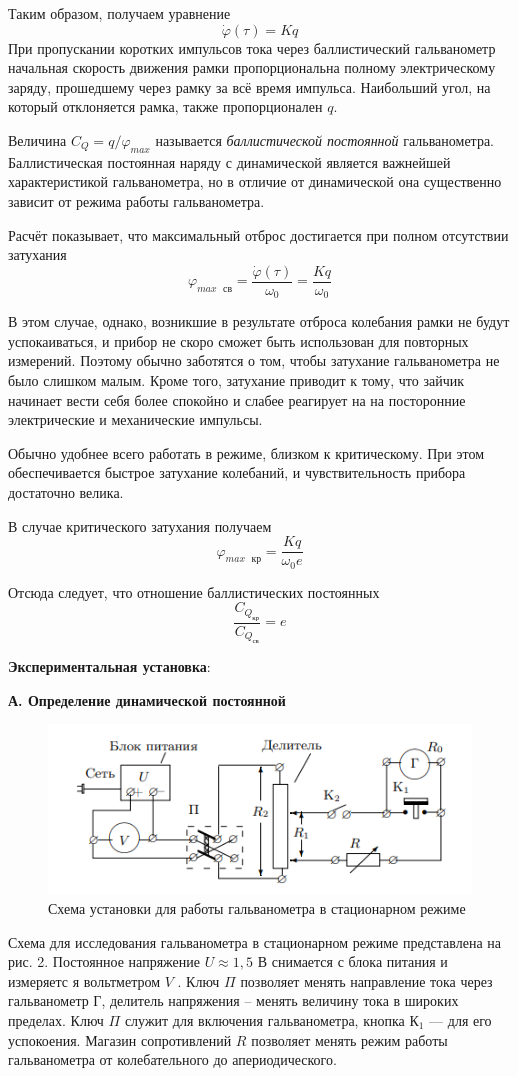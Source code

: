 \documentclass[a4paper,12pt]{article}
\begin{document}
Таким образом, получаем уравнение
\begin{equation}\label{eq: izmerenieZaryada}
    \dot\varphi (\tau) = Kq
\end{equation}
При пропускании коротких импульсов тока через баллистический гальванометр начальная скорость движения рамки пропорциональна полному электрическому заряду, прошедшему через рамку за всё время импульса. Наибольший угол, на который отклоняется рамка, также пропорционален $q$.

Величина $C_Q = q / \varphi_{max}$ называется \textit{баллистической постоянной} гальванометра. Баллистическая постоянная наряду с динамической является важнейшей
характеристикой гальванометра, но в отличие от динамической она существенно зависит от режима работы гальванометра.

Расчёт показывает, что максимальный отброс достигается при полном отсутствии затухания
\[\varphi_{max \text{ }св} = \frac{\dot\varphi (\tau)}{\omega_0} = \frac{K q}{\omega_0}\]

В этом случае, однако, возникшие в результате отброса колебания рамки не будут успокаиваться, и прибор не скоро сможет быть использован для повторных измерений. Поэтому обычно заботятся о том, чтобы затухание гальванометра не было слишком малым. Кроме того, затухание приводит к тому, что зайчик начинает вести себя более спокойно и слабее реагирует на на посторонние электрические и механические импульсы.

Обычно удобнее всего работать в режиме, близком к критическому. При этом обеспечивается быстрое затухание колебаний, и чувствительность прибора достаточно велика.

В случае критического затухания получаем 
\[\varphi_{max \text{ }кр} = \frac{K q}{\omega_0 e}\]

Отсюда следует, что отношение баллистических постоянных 
\[\frac{C_{Q_{кр}}}{C_{Q_{св}}} = e\]

\textbf{Экспериментальная установка}: 

\textbf{А. Определение динамической постоянной}
\begin{figure}[H]\label{fig: ustanovkaStatRejim}
    \centering
    \includegraphics[width = 0.8 \textwidth]{УстновкаСтац.png}
    \caption{Схема установки для работы гальванометра в стационарном режиме}
\end{figure}
Схема для исследования гальванометра в стационарном режиме представлена на рис. 2. Постоянное напряжение $U \approx 1,5$ В снимается с блока питания и измеряетс я вольтметром $V$ . Ключ $\Pi$ позволяет менять направление тока через гальванометр $Г$, делитель напряжения -- менять величину тока в широких пределах. Ключ $\Pi$ служит для включения гальванометра, кнопка $К_1$ — для его успокоения. Магазин сопротивлений $R$ позволяет менять режим работы гальванометра от колебательного до апериодического. 
\end{document}
